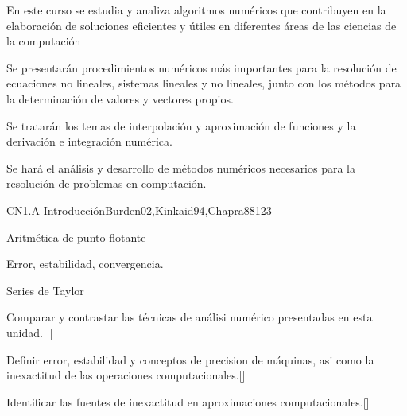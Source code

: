 \begin{syllabus}


\begin{justification}
En este curso se estudia y analiza algoritmos numéricos que
contribuyen en la elaboración de soluciones eficientes y útiles en
diferentes áreas de las ciencias de la computación
\end{justification}

\begin{goals}
\item Se presentarán procedimientos numéricos más importantes para la resolución de 
ecuaciones no lineales, sistemas lineales y no lineales, junto con los métodos 
para la determinación de valores y vectores propios.

\item Se tratarán los temas de interpolación y aproximación de funciones y la 
derivación e integración numérica.

\item Se hará el análisis y desarrollo de métodos numéricos necesarios para la 
resolución de problemas en computación.
\end{goals}

\begin{outcomes}
\item {}
\item {}
\item {}
\end{outcomes}

\begin{competences} 
    \item {}
    \item {}
\end{competences}

\begin{unit}{}{CN1.A Introducción}{Burden02,Kinkaid94,Chapra88}{12}{3}
  \begin{topics}
      \item Aritmética de punto flotante
      \item Error, estabilidad, convergencia.
      \item Series de Taylor
   \end{topics}

   \begin{learningoutcomes}
      \item Comparar y contrastar las técnicas de análisi numérico presentadas en esta unidad. [\Usage]
      \item Definir error, estabilidad y conceptos de precision de máquinas, asi como la inexactitud de las operaciones computacionales.[\Usage]
      \item Identificar las fuentes de inexactitud en aproximaciones computacionales.[\Usage]
   \end{learningoutcomes}
\end{unit}


\end{syllabus}
